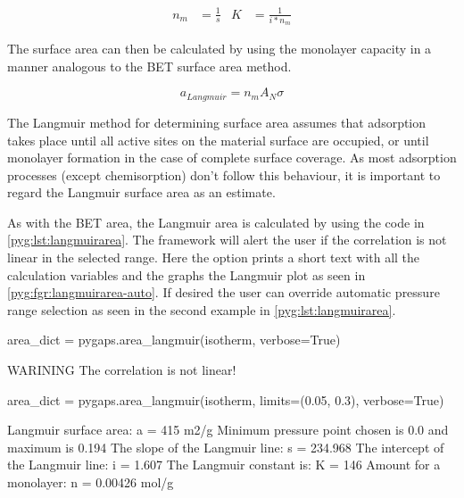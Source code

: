 \begin{align}
	n_m & = \frac{1}{s} & K & = \frac{1}{i * n_m}
\end{align}

The surface area can then be calculated by using the monolayer
capacity in a manner analogous to the BET surface area method.

\begin{equation}
	a_{Langmuir} = n_m A_N \sigma
\end{equation}

The Langmuir method for determining surface area assumes that
adsorption takes place until all active sites on the material
surface are occupied, or until monolayer formation in the
case of complete surface coverage. As most adsorption processes
(except chemisorption) don't follow this behaviour, it is
important to regard the Langmuir surface area as an estimate.

As with the BET area, the Langmuir area is calculated by using the code in
\autoref{pyg:lst:langmuirarea}. The framework will alert the user
if the correlation is not linear in the selected range.
Here the  option prints a short
text with all the calculation variables and the graphs the
Langmuir plot as seen in \autoref{pyg:fgr:langmuirarea-auto}.
If desired the user can override
automatic pressure range selection as seen in the second example in
\autoref{pyg:lst:langmuirarea}.

\begin{samepage}
	\begin{python}[caption={Calculating a Langmuir area},label={pyg:lst:langmuirarea}]
area_dict = pygaps.area_langmuir(isotherm, verbose=True)
\end{python}
	\begin{pythonout}
WARINING The correlation is not linear!
\end{pythonout}
	\begin{python}
area_dict = pygaps.area_langmuir(isotherm, 
                                 limits=(0.05, 0.3), 
                                 verbose=True)
\end{python}
	\begin{pythonout}
Langmuir surface area: 	a = 415 m2/g
Minimum pressure point chosen is 0.0 and maximum is 0.194
The slope of the Langmuir line: 		s = 234.968
The intercept of the Langmuir line: 	i = 1.607
The Langmuir constant is:				K = 146
Amount for a monolayer: 				n = 0.00426 mol/g
\end{pythonout}
\end{samepage}

